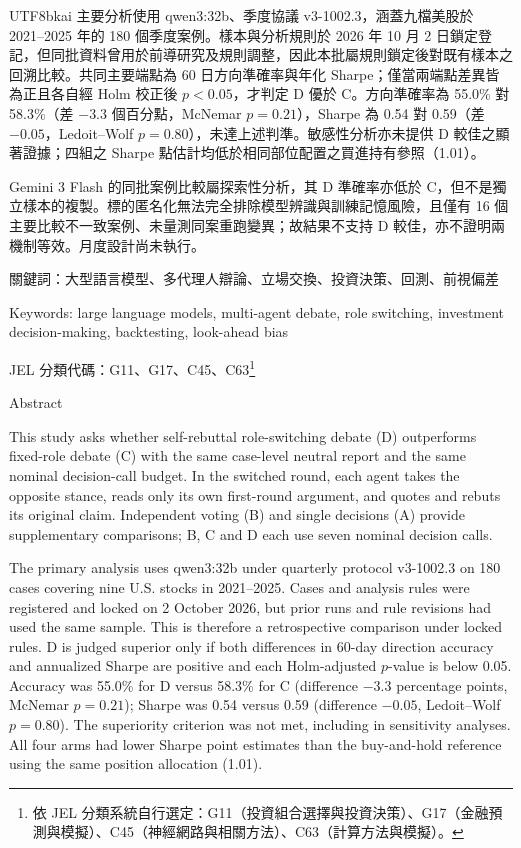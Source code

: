 \documentclass[12pt,a4paper]{article}
\newcommand{\grp}[1]{\textsf{#1}}
\begin{document}
\begin{CJK}{UTF8}{bkai}
主要分析使用 qwen3:32b、季度協議 v3-1002.3，涵蓋九檔美股於 2021--2025 年的 180 個季度案例。樣本與分析規則於 2026 年 10 月 2 日鎖定登記，但同批資料曾用於前導研究及規則調整，因此本批屬規則鎖定後對既有樣本之回溯比較。共同主要端點為 60 日方向準確率與年化 Sharpe；僅當兩端點差異皆為正且各自經 Holm 校正後 $p<0.05$，才判定 \grp{D} 優於 \grp{C}。方向準確率為 55.0\% 對 58.3\%（差 $-3.3$ 個百分點，McNemar $p=0.21$），Sharpe 為 0.54 對 0.59（差 $-0.05$，Ledoit--Wolf $p=0.80$），未達上述判準。敏感性分析亦未提供 \grp{D} 較佳之顯著證據；四組之 Sharpe 點估計均低於相同部位配置之買進持有參照（1.01）。

Gemini 3 Flash 的同批案例比較屬探索性分析，其 \grp{D} 準確率亦低於 \grp{C}，但不是獨立樣本的複製。標的匿名化無法完全排除模型辨識與訓練記憶風險，且僅有 16 個主要比較不一致案例、未量測同案重跑變異；故結果不支持 \grp{D} 較佳，亦不證明兩機制等效。月度設計尚未執行。

\vspace{0.6cm}
\noindent 關鍵詞：大型語言模型、多代理人辯論、立場交換、投資決策、回測、前視偏差

\vspace{0.2cm}
\noindent Keywords: large language models, multi-agent debate, role switching, investment decision-making, backtesting, look-ahead bias

\vspace{0.2cm}
\noindent JEL 分類代碼：G11、G17、C45、C63\footnote{依 JEL 分類系統自行選定：G11（投資組合選擇與投資決策）、G17（金融預測與模擬）、C45（神經網路與相關方法）、C63（計算方法與模擬）。}

\clearpage
\begin{center}
{\fontsize{16}{24}\selectfont Abstract\par}
\end{center}
\vspace{0.3cm}

\noindent This study asks whether self-rebuttal role-switching debate (D) outperforms fixed-role debate (C) with the same case-level neutral report and the same nominal decision-call budget. In the switched round, each agent takes the opposite stance, reads only its own first-round argument, and quotes and rebuts its original claim. Independent voting (B) and single decisions (A) provide supplementary comparisons; B, C and D each use seven nominal decision calls.

\noindent The primary analysis uses qwen3:32b under quarterly protocol v3-1002.3 on 180 cases covering nine U.S. stocks in 2021--2025. Cases and analysis rules were registered and locked on 2 October 2026, but prior runs and rule revisions had used the same sample. This is therefore a retrospective comparison under locked rules. D is judged superior only if both differences in 60-day direction accuracy and annualized Sharpe are positive and each Holm-adjusted $p$-value is below 0.05. Accuracy was 55.0\% for D versus 58.3\% for C (difference $-3.3$ percentage points, McNemar $p=0.21$); Sharpe was 0.54 versus 0.59 (difference $-0.05$, Ledoit--Wolf $p=0.80$). The superiority criterion was not met, including in sensitivity analyses. All four arms had lower Sharpe point estimates than the buy-and-hold reference using the same position allocation (1.01).


\end{CJK}
\end{document}
